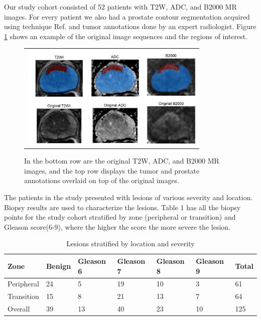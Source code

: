 Our study cohort consisted of 52 patients with T2W, ADC, and B2000 MR images. For every patient we also had a prostate contour segmentation acquired using technique Ref.  and tumor annotations done by an expert radiologist. Figure \ref{fig:Fig1} shows an example of the original image sequences and the regions of interest.     

 \begin{figure} [ht]
   \begin{center}
   \begin{tabular}{c}
   \includegraphics[height=5cm]{Figure1}
   \end{tabular}
   \end{center}
   \caption[Fig1]
   { \label{fig:Fig1} 
In the bottom row are the original T2W, ADC, and B2000 MR images, and the top row displays the tumor and prostate annotations overlaid on top of the original images.}
   \end{figure} 
   The patients in the study presented with lesions of various severity and location. Biopsy results are used to characterize the lesions. Table 1 has all the biopsy points for the study cohort stratified by zone (peripheral or transition) and Gleason score(6-9), where the higher the score the more severe the lesion. 

\begin{table}[ht]
\caption{Lesions stratified by location and severity} 
\label{tab:table1}
\begin{center}       
\begin{tabular}{|l|l|l|l|l|l|l|} 
\hline
\rule[-1ex]{0pt}{3.5ex} Zone &	Benign &	Gleason 6 &	Gleason 7 &	Gleason 8 &	Gleason 9 &	Total\\
\hline
\rule[-1ex]{0pt}{3.5ex} Peripheral &	24 &	5 &	19 &	10 &	3 &	61 \\
\rule[-1ex]{0pt}{3.5ex} Transition &	15 &	8 &	21 &	13 &	7 &	64 \\
\rule[-1ex]{0pt}{3.5ex} Overall &	39 &	13 &	40 &	23 &	10 &	125 \\ 
\hline
\end{tabular}
\end{center}
\end{table}


